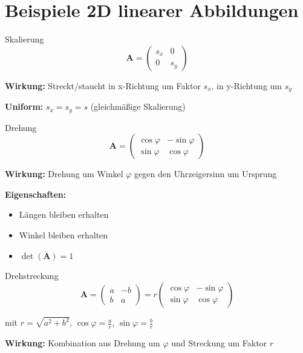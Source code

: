 \documentclass[a4paper, fontsize=7pt]{scrartcl}
\begin{document}
\section{Beispiele 2D linearer Abbildungen}

\begin{mainbox}{Skalierung}
$$\mathbf{A} = \begin{pmatrix} s_x & 0 \\ 0 & s_y \end{pmatrix}$$

\textbf{Wirkung:} Streckt/staucht in x-Richtung um Faktor $s_x$, in y-Richtung um $s_y$

\textbf{Uniform:} $s_x = s_y = s$ (gleichmäßige Skalierung)
\end{mainbox}

\begin{mainbox}{Drehung}
$$\mathbf{A} = \begin{pmatrix} \cos\varphi & -\sin\varphi \\ \sin\varphi & \cos\varphi \end{pmatrix}$$

\textbf{Wirkung:} Drehung um Winkel $\varphi$ gegen den Uhrzeigersinn um Ursprung

\textbf{Eigenschaften:}
\begin{itemize}
    \item Längen bleiben erhalten
    \item Winkel bleiben erhalten
    \item $\det(\mathbf{A}) = 1$
\end{itemize}
\end{mainbox}

\begin{mainbox}{Drehstreckung}
$$\mathbf{A} = \begin{pmatrix} a & -b \\ b & a \end{pmatrix} = r\begin{pmatrix} \cos\varphi & -\sin\varphi \\ \sin\varphi & \cos\varphi \end{pmatrix}$$

mit $r = \sqrt{a^2 + b^2}$, $\cos\varphi = \frac{a}{r}$, $\sin\varphi = \frac{b}{r}$

\textbf{Wirkung:} Kombination aus Drehung um $\varphi$ und Streckung um Faktor $r$
\end{mainbox}
\end{document}
